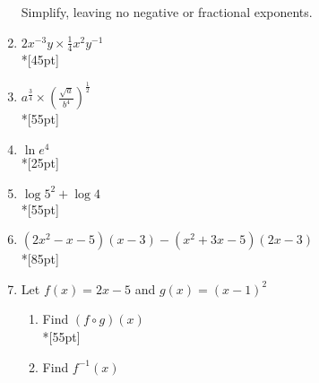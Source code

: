\documentclass[12pt, oneside]{article}
\begin{document}
\begin{enumerate}
\newpage
Simplify, leaving no negative or fractional exponents.

\item $2x^{-3}y \times \frac{1}{4}x^2 y^{-1}$\\*[45pt]
\item $\displaystyle a^{\frac{3}{4}} \times (\frac{\sqrt{a}}{b^4})^{\frac{1}{2}}$\\*[55pt]
\item $\ln{e^4}$\\*[25pt]
\item $\log 5^2 + \log 4$\\*[55pt]
\item $(2x^2-x-5)(x-3)-(x^2+3x-5)(2x-3)$\\*[85pt]

\item Let $f(x) = 2x -5$ and $g(x)=(x-1)^2$
\begin{enumerate}
    \item Find $(f \circ g)(x)$\\*[55pt]
    \item Find $f^{-1}(x)$
\end{enumerate}


\end{enumerate}
\end{document}
